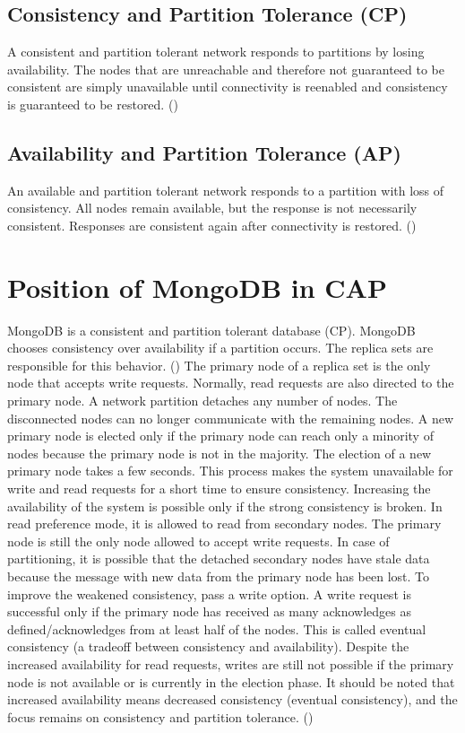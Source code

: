 \subsection*{Consistency and Partition Tolerance (CP)}
A consistent and partition tolerant network responds to partitions by losing availability. The nodes that are unreachable and therefore not guaranteed to be consistent are simply unavailable until connectivity is reenabled and consistency is guaranteed to be restored. (\cite[p.~6]{brewer:2002})
\subsection*{Availability and Partition Tolerance (AP)}
An available and partition tolerant network responds to a partition with loss of consistency. All nodes remain available, but the response is not necessarily consistent. Responses are consistent again after connectivity is restored. (\cite[p.~6]{brewer:2002})
\pagebreak
\section*{Position of MongoDB in CAP}
MongoDB is a consistent and partition tolerant database (\acs{CP}). MongoDB chooses consistency over availability if a partition occurs. The replica sets are responsible for this behavior. (\cite{stackoverflow:2023})
The primary node of a replica set is the only node that accepts write requests. Normally, read requests are also directed to the primary node. A network partition detaches any number of nodes. The disconnected nodes can no longer communicate with the remaining nodes. A new primary node is elected only if the primary node can reach only a minority of nodes because the primary node is not in the majority. The election of a new primary node takes a few seconds. This process makes the system unavailable for write and read requests for a short time to ensure consistency.\newline
Increasing the availability of the system is possible only if the strong consistency is broken. In read preference mode, it is allowed to read from secondary nodes. The primary node is still the only node allowed to accept write requests. In case of partitioning, it is possible that the detached secondary nodes have stale data because the message with new data from the primary node has been lost.\newline
To improve the weakened consistency, pass a write option. A write request is successful only if the primary node has received as many acknowledges as defined/acknowledges from at least half of the nodes. This is called eventual consistency (a tradeoff between consistency and availability). Despite the increased availability for read requests, writes are still not possible if the primary node is not available or is currently in the election phase. It should be noted that increased availability means decreased consistency (eventual consistency), and the focus remains on consistency and partition tolerance. 
(\cite{katwal:2020})